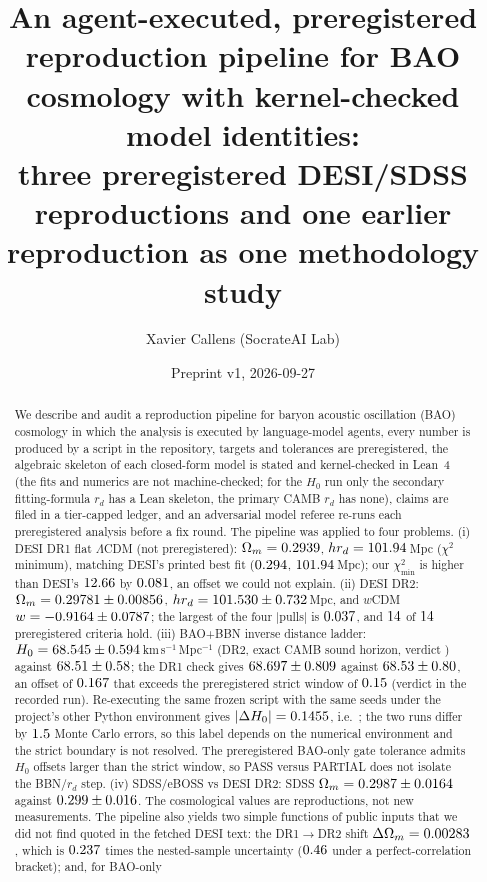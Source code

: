 \documentclass[11pt]{article}
\title{An agent-executed, preregistered reproduction pipeline for BAO cosmology with kernel-checked model identities:\\
three preregistered DESI/SDSS reproductions and one earlier reproduction as one methodology study}
\author{Xavier Callens (SocrateAI Lab)}
\date{Preprint v1, 2026-09-27}
\newcommand{\kms}{km\,s$^{-1}$\,Mpc$^{-1}$}
\begin{document}
\maketitle

\begin{abstract}
We describe and audit a reproduction pipeline for baryon acoustic oscillation (BAO) cosmology in which the analysis is executed by
language-model agents, every number is produced by a script in the repository, targets and tolerances are preregistered, the
algebraic skeleton of each closed-form model is stated and kernel-checked in Lean~4 (the fits and numerics are not machine-checked; for the $H_0$ run only the secondary fitting-formula $r_d$ has a Lean skeleton, the primary CAMB $r_d$ has none), claims are filed in a tier-capped ledger, and an adversarial
model referee re-runs each preregistered analysis before a fix round. The pipeline was applied to four problems. (i) DESI DR1 flat $\Lambda$CDM
(not preregistered): $\Omega_m=0.2939$, $h r_d=101.94$\,Mpc ($\chi^2$ minimum), matching DESI's printed best fit ($0.294$, $101.94$\,Mpc);
our $\chi^2_{\min}$ is higher than DESI's $12.66$ by $0.081$, an offset we could not explain. (ii) DESI DR2: $\Omega_m=0.29781\pm0.00856$, $hr_d=101.530\pm0.732$\,Mpc, and $w$CDM
$w=-0.9164\pm0.0787$; the largest of the four $|$pulls$|$ is $0.037$, and $14$ of $14$ preregistered criteria hold. (iii) BAO+BBN inverse distance ladder:
$H_0=68.545\pm0.594$\,\kms{} (DR2, exact CAMB sound horizon, verdict \hzPOneV) against $68.51\pm0.58$; the DR1 check gives
$68.697\pm0.809$ against $68.53\pm0.80$, an offset of $0.167$ that exceeds the preregistered strict window of $0.15$
(verdict \hzPTwoV{} in the recorded run). Re-executing the same frozen script with the same seeds under the project's other Python environment
gives $|\Delta H_0|=0.1455$, i.e.\ \rePTwoV; the two runs differ by $1.5$ Monte Carlo errors, so this label depends on the numerical
environment and the strict boundary is not resolved. The preregistered BAO-only gate tolerance admits $H_0$ offsets larger than the strict window, so PASS versus PARTIAL
does not isolate the BBN/$r_d$ step. (iv) SDSS/eBOSS vs DESI DR2: SDSS $\Omega_m=0.2987\pm0.0164$ against $0.299\pm0.016$. The cosmological values
are reproductions, not new measurements. The pipeline also yields two simple functions of public inputs that we did not find quoted in the fetched DESI text: the DR1$\to$DR2 shift
$\Delta\Omega_m=0.00283$, which is $0.237$ times the nested-sample uncertainty ($0.46$ under a perfect-correlation bracket); and, for BAO-only

\end{abstract}
\end{document}
